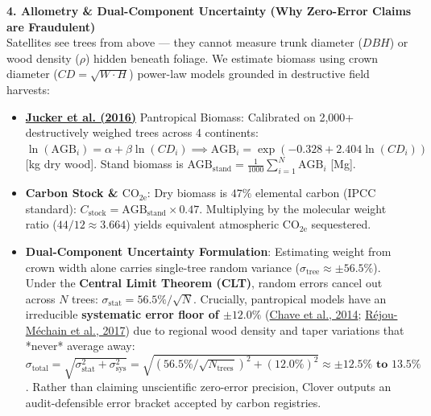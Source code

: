 \documentclass[10pt,a4paper]{article}
\begin{document}
\newpage %

\noindent\textbf{\large 4. Allometry \& Dual-Component Uncertainty (Why Zero-Error Claims are Fraudulent)}\\[0.25em]
Satellites see trees from above — they cannot measure trunk diameter ($DBH$) or wood density ($\rho$) hidden beneath foliage. We estimate biomass using crown diameter ($CD = \sqrt{W \cdot H}$) power-law models grounded in destructive field harvests:
\begin{itemize}
    \item \textbf{\href{https://doi.org/10.1111/gcb.13388}{Jucker et al. (2016)}} Pantropical Biomass: Calibrated on 2,000+ destructively weighed trees across 4 continents: $\ln(\text{AGB}_i) = \alpha + \beta \ln(CD_i) \implies \text{AGB}_i = \exp\left(-0.328 + 2.404 \ln(CD_i)\right)$ [kg dry wood]. Stand biomass is $\text{AGB}_{\text{stand}} = \frac{1}{1000} \sum_{i=1}^N \text{AGB}_i$ [Mg].
    \item \textbf{Carbon Stock \& $\text{CO}_{2\text{e}}$}: Dry biomass is $47\%$ elemental carbon (IPCC standard): $C_{\text{stock}} = \text{AGB}_{\text{stand}} \times 0.47$. Multiplying by the molecular weight ratio ($44/12 \approx 3.664$) yields equivalent atmospheric $\text{CO}_{2\text{e}}$ sequestered.
    \item \textbf{Dual-Component Uncertainty Formulation}: Estimating weight from crown width alone carries single-tree random variance ($\sigma_{\text{tree}} \approx \pm 56.5\%$). Under the \textbf{Central Limit Theorem (CLT)}, random errors cancel out across $N$ trees: $\sigma_{\text{stat}} = 56.5\% / \sqrt{N}$. Crucially, pantropical models have an irreducible \textbf{systematic error floor of $\pm 12.0\%$} (\href{https://doi.org/10.1111/gcb.12629}{Chave et al., 2014}; \href{https://doi.org/10.1111/2041-210X.12753}{R\'ejou-M\'echain et al., 2017}) due to regional wood density and taper variations that *never* average away: $\sigma_{\text{total}} = \sqrt{\sigma_{\text{stat}}^2 + \sigma_{\text{sys}}^2} = \sqrt{(56.5\%/\sqrt{N_{\text{trees}}})^2 + (12.0\%)^2} \approx \mathbf{\pm 12.5\%\text{ to } 13.5\%}$. Rather than claiming unscientific zero-error precision, Clover outputs an audit-defensible error bracket accepted by carbon registries.
\end{itemize}
\end{document}

